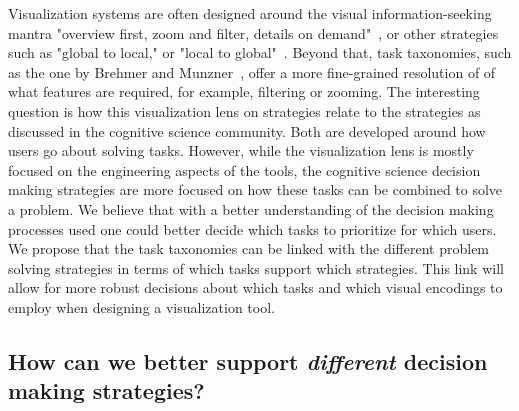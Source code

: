 
Visualization systems are often designed around the visual information-seeking mantra "overview first, zoom and
filter, details on demand"~\cite{Shneiderman:1996}, or other strategies such as "global to local,"
or "local to global"~\cite{Sedlmair:2014}. Beyond that, task taxonomies, such as the one by Brehmer and Munzner~\citep{Brehmer:2013}, offer a more fine-grained resolution of
of what features are required, for example, filtering or zooming. 
The interesting question is how this visualization lens on strategies relate to the strategies as discussed in the cognitive science community. 
Both are developed around how users
go about solving tasks. However, while the visualization lens
is mostly focused on the engineering aspects of the tools, 
the cognitive science decision making strategies are more focused on how these tasks can be combined to
solve a problem.
We believe that with a better understanding of the decision making processes 
used one could better decide which tasks to prioritize for which users.
We propose that the task taxonomies can be linked with the different problem
solving strategies in terms of which tasks support which strategies. This 
link will allow for more robust decisions about
which tasks and which visual encodings to employ when designing a 
visualization tool.




\subsection{How can we better support \emph{different} decision making strategies?}

